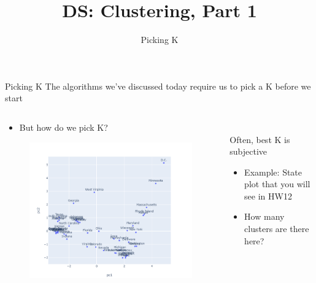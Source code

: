 \documentclass[aspectratio=169]{../latex_main/tntbeamer}  %
\title[Introduction]{DS: Clustering, Part 1}
\subtitle{Picking K}
\begin{document}
	
	\maketitle
	\begin{frame}{Picking K}
	    The algorithms we’ve discussed today require us to pick a K before we start
	    \begin{columns}
	        \begin{column}{.6\textwidth}
	                \begin{itemize}
	                    \item But how do we pick K?
	                \end{itemize}
	                \begin{figure}
	                    \centering
	                    \includegraphics[scale=.45]{Bild55}
	                \end{figure}
	        \end{column}
	        
	        
	        \begin{column}{.4\textwidth}
	        \\
	        \bigskip
	            Often, best K is subjective
	                \begin{itemize}
	                    \item Example: State plot that you will see in HW12
	                    \item How many clusters are there here?
	                \end{itemize}
	        \end{column}
	    \end{columns}
	\end{frame}
	
\end{document}
